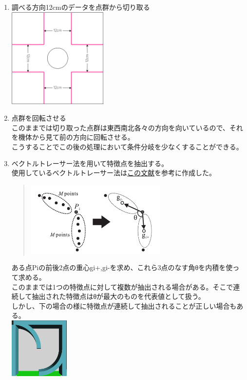 \documentclass[dvipdfmx,a4paper]{jsarticle}
\begin{document}
    \begin{enumerate}
      \item 調べる方向12cmのデータを点群から切り取る\\
        \includegraphics[width=50mm]{Photo/LiDAR/4.png}
      \item 点群を回転させる\\
        このままでは切り取った点群は東西南北各々の方向を向いているので、それを機体から見て前の方向に回転させる。\\
        こうすることでこの後の処理において条件分岐を少なくすることができる。
      \item ベクトルトレーサー法を用いて特徴点を抽出する。\\
        使用しているベクトルトレーサー法は\href{https://www.jstage.jst.go.jp/article/jsprs/48/5/48_5_308/_pdf}{この文献}を参考に作成した。\\
        \begin{quote}
          \includegraphics[width=70mm]{Photo/LiDAR/5.png}
        \end{quote}
        ある点Piの前後2点の重心gi+,gi-を求め、これら3点のなす角θを内積を使って求める。\\
        このままでは1つの特徴点に対して複数が抽出される場合がある。そこで連続して抽出された特徴点はθが最大のものを代表値として扱う。\\
        しかし、下の場合の様に特徴点が連続して抽出されることが正しい場合もある。\\
        \includegraphics[width=30mm]{Photo/LiDAR/6.png}

\end{enumerate}
\end{document}
